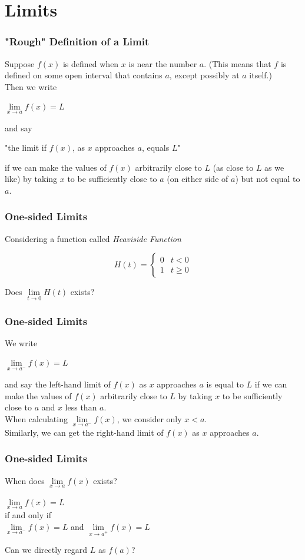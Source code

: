 \section{Limits}
\begin{frame}
	\frametitle{"Rough" Definition of a Limit}
	Suppose $f(x)$ is defined when $x$ is near the number $a$. (This means that $f$ is defined on some open interval that contains $a$, \alert{except possibly} at $a$ itself.)\\
	Then we write
	\begin{center}
		$\lim\limits_{\textit{x} \to a}f(x) = L$
	\end{center}
	and say
	\begin{center}
		"the limit if $f(x)$, as $x$ approaches $a$, equals $L$"
	\end{center}
	if we can make the values of $f(x)$ arbitrarily close to $L$ (as close to $L$ as we like) by taking $x$ to be \alert{sufficiently close to} $a$ (on either side of $a$) but \alert{not equal to} $a$.
\end{frame}
\begin{frame}
	\frametitle{One-sided Limits}
	Considering a function called \textit{Heaviside Function}\\
	\begin{center}
		\begin{equation}
			H(t)=
			\begin{cases}
				0 & t<0      \\
				1 & t \geq 0
			\end{cases}
		\end{equation}
	\end{center}
	Does $\lim\limits_{\textit{t} \to 0}H(t)$ exists?
\end{frame}
\begin{frame}
	\frametitle{One-sided Limits}
	We write
	\begin{center}
		$\lim\limits_{\textit{x} \to a^{-}}f(x) = L$
	\end{center}
	and say the left-hand limit of $f(x)$ as $x$ approaches $a$ is equal to $L$ if we can make the values of $f(x)$ arbitrarily close to $L$ by taking $x$ to be \alert{sufficiently close to} $a$ and $x$ less than $a$.\\
	\bigskip
	When calculating $\lim\limits_{\textit{x} \to a^{-}}f(x)$, we consider only $x < a$.\\
	\bigskip
	Similarly, we can get the right-hand limit of $f(x)$ as $x$ approaches $a$.
\end{frame}
\begin{frame}
	\frametitle{One-sided Limits}
	When does $\lim\limits_{\textit{x} \to a}f(x)$ exists?\\
	\bigskip
	\begin{center}
		$\lim\limits_{\textit{x} \to a}f(x) = L$\\
		\bigskip
		\alert{if and only if}\\
		\bigskip
		$\lim\limits_{\textit{x} \to a^{-}}f(x) = L$ and $\lim\limits_{\textit{x} \to a^{+}}f(x) = L$
	\end{center}
	Can we directly regard $L$ as $f(a)$?
\end{frame}
